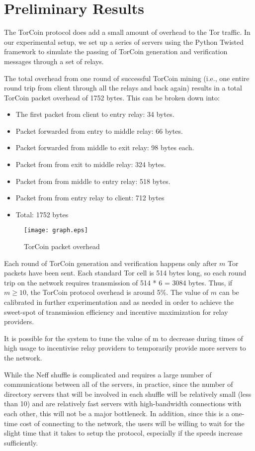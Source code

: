 \section{Preliminary Results}

The TorCoin protocol does add a small amount of overhead to the Tor traffic.
In our experimental setup, we set up a series of servers using the Python
Twisted framework\cite{twisted} to simulate the passing of TorCoin generation and
verification messages through a set of relays.

The total overhead from one round of successful TorCoin mining (i.e., one
entire round trip from client through all the relays and back again) results
in a total TorCoin packet overhead of 1752 bytes. This can be broken down
into:

\begin{itemize}
\item The first packet from client to entry relay: 34 bytes.
\item Packet forwarded from entry to middle relay: 66 bytes.
\item Packet forwarded from middle to exit relay: 98 bytes each.
\item Packet from from exit to middle relay: 324 bytes.
\item Packet from from middle to entry relay: 518 bytes.
\item Packet from from entry relay to client: 712 bytes
\item Total: 1752 bytes
\end{itemize}

\begin{figure}
  \centering
    \texttt{[image: graph.eps]}
  \caption{TorCoin packet overhead}
\end{figure}
Each round of TorCoin generation and verification happens only after $m$ Tor
packets have been sent. Each standard Tor cell is 514 bytes long, so each
round trip on the network requires transmission of 514 * 6 = 3084 bytes. Thus,
if $m \geq 10$, the TorCoin protocol overhead is around 5\%. The value of $m$
can be calibrated in further experimentation and as needed in order to achieve
the sweet-spot of transmission efficiency and incentive maximization for relay
providers.

It is possible for the system to tune the value of m to decrease during times
of high usage to incentivise relay providers to temporarily provide more
servers to the network.


While the Neff shuffle is complicated and requires a large number of
communications between all of the servers, in practice, since the number of
directory servers that will be involved in each shuffle will be relatively
small (less than 10) and are relatively fast servers with high-bandwidth
connections with each other, this will not be a major bottleneck. In addition,
since this is a one-time cost of connecting to the network, the users will be
willing to wait for the slight time that it takes to setup the protocol,
especially if the speeds increase sufficiently.
